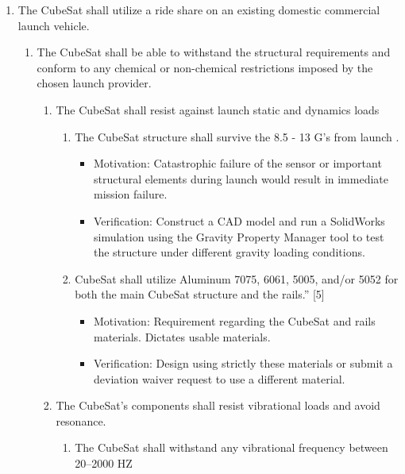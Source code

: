 \begin{enumerate}
\begin{enumerate}
    \end{enumerate} %
    \item The CubeSat shall utilize a ride share on an existing domestic commercial launch vehicle.
    \begin{enumerate}
        \item The CubeSat shall be able to withstand the structural requirements and conform to any chemical or non-chemical restrictions imposed by the chosen launch provider.  
        \begin{enumerate}
            \item The CubeSat shall resist against launch static and dynamics loads 
            \begin{enumerate}
                \item The CubeSat structure shall survive the 8.5 - 13 G’s from launch \cite{}. 
                    \begin{itemize}
                        \item Motivation: Catastrophic failure of the sensor or important structural elements during launch would result in immediate mission failure.  
                        \item Verification: Construct a CAD model and run a SolidWorks simulation using the Gravity Property Manager tool to test the structure under different gravity loading conditions.
                    \end{itemize}
                \item CubeSat shall utilize Aluminum 7075, 6061, 5005, and/or 5052 for both the main CubeSat structure and the rails.” [5] \cite{} 
                    \begin{itemize}
                        \item Motivation: Requirement regarding the CubeSat and rails materials. Dictates usable materials.   
                        \item Verification: Design using strictly these materials or submit a deviation waiver request to use a different material. 
                    \end{itemize}
            \end{enumerate}
        \item The CubeSat’s components shall resist vibrational loads and avoid resonance. 
        \begin{enumerate}
            \item The CubeSat shall withstand any vibrational frequency between 20–2000 HZ 
                \begin{itemize}

\end{itemize}
\end{enumerate}
\end{enumerate}
\end{enumerate}
\end{enumerate}
